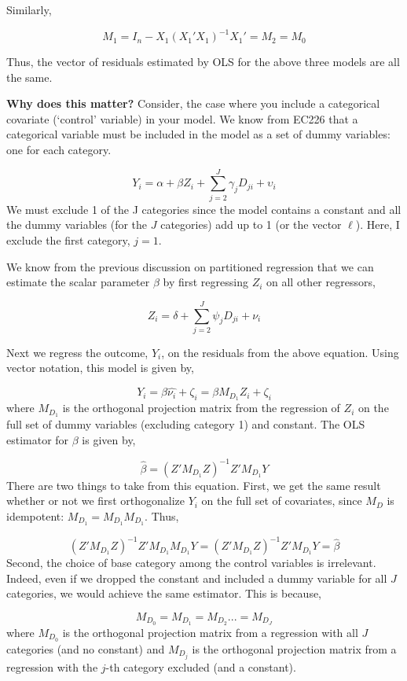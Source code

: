 \documentclass[
  letterpaper,
  DIV=11,
  numbers=noendperiod]{scrreprt}
\begin{document}
Similarly,

\[
M_1 = I_n-X_1(X_1'X_1)^{-1}X_1' = M_2 = M_0
\]

Thus, the vector of residuals estimated by OLS for the above three
models are all the same.

\textbf{Why does this matter?} Consider, the case where you include a
categorical covariate (`control' variable) in your model. We know from
EC226 that a categorical variable must be included in the model as a set
of dummy variables: one for each category.

\[
Y_i = \alpha + \beta Z_i + \sum_{j=2}^J \gamma_j D_{ji} + \upsilon_i
\] We must exclude 1 of the J categories since the model contains a
constant and all the dummy variables (for the \(J\) categories) add up
to 1 (or the vector \(\ell\)). Here, I exclude the first category,
\(j=1\).

We know from the previous discussion on partitioned regression that we
can estimate the scalar parameter \(\beta\) by first regressing \(Z_i\)
on all other regressors,

\[
Z_i = \delta + \sum_{j=2}^J \psi_j D_{ji} + \nu_i
\]

Next we regress the outcome, \(Y_i\), on the residuals from the above
equation. Using vector notation, this model is given by,

\[
  Y_i = \beta \hat{\nu_i}+\zeta_i = \beta M_{D_1}Z_i+\zeta_i
\] where \(M_{D_1}\) is the orthogonal projection matrix from the
regression of \(Z_i\) on the full set of dummy variables (excluding
category 1) and constant. The OLS estimator for \(\beta\) is given by,

\[
  \hat{\beta} = (Z'M_{D_1}Z)^{-1}Z'M_{D_1}Y
\] There are two things to take from this equation. First, we get the
same result whether or not we first orthogonalize \(Y_i\) on the full
set of covariates, since \(M_D\) is idempotent:
\(M_{D_1} = M_{D_1}M_{D_1}\). Thus,

\[
  (Z'M_{D_1}Z)^{-1}Z'M_{D_1}M_{D_1}Y = (Z'M_{D_1}Z)^{-1}Z'M_{D_1}Y = \hat{\beta}
\] Second, the choice of base category among the control variables is
irrelevant. Indeed, even if we dropped the constant and included a dummy
variable for all \(J\) categories, we would achieve the same estimator.
This is because,

\[
M_{D_0} = M_{D_1} = M_{D_2} ... = M_{D_J}
\] where \(M_{D_0}\) is the orthogonal projection matrix from a
regression with all \(J\) categories (and no constant) and \(M_{D_j}\)
is the orthogonal projection matrix from a regression with the \(j\)-th
category excluded (and a constant).
\end{document}
